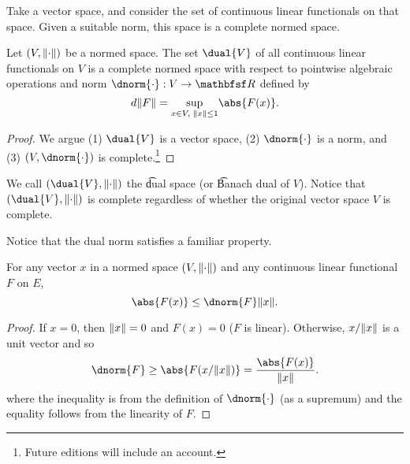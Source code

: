 

Take a vector space, and consider the set of continuous linear functionals on that space.
Given a suitable norm, this space is a complete normed space.


\begin{proposition}
	Let $(V, \lVert\cdot\rVert)$ be a normed space.
	The set $\dual{V}$ of all continuous linear functionals on $V$ is a complete normed space with respect to pointwise algebraic operations and norm $\dnorm{\cdot}: V \to \R$ defined by
	\[
		d\norm{F} = \underset{x \in V, \;\norm{x} \leq 1}{\sup} \abs{F(x)}.
	\]
	\begin{proof}
	We argue (1) $\dual{V}$ is a vector space,  (2) $\dnorm{\cdot}$ is a norm, and (3) $(V, \dnorm{\cdot})$ is complete.\footnote{Future editions will include an account.}		
	\end{proof}
\end{proposition}

We call $(\dual{V}, \normm{\cdot})$ the \t{dual space} (or \t{Banach dual of $V$}).
Notice that $(\dual{V}, \normm{\cdot})$ is complete regardless of whether the original vector space $V$ is complete.


Notice that the dual norm satisfies a familiar property.

\begin{proposition}
	For any vector $x$ in a normed space $(V, \lVert\cdot\rVert)$ and any continuous linear functional $F$ on $E$,
	\[
		\abs{F(x)} \leq \dnorm{F}\norm{x}.
	\]
	\begin{proof}
		If $x = 0$, then $\lVert x\rVert = 0$ and $F(x) = 0$ ($F$ is linear). Otherwise, $x/\lVert x\rVert$ is a unit vector and so
		\[
			\dnorm{F} \geq \abs{F(x/\norm{x})} = \frac{\abs{F(x)}}{\norm{x}}.
		\]
		where the inequality is from the definition of $\dnorm{\cdot}$ (as a supremum) and the equality follows from the linearity of $F$.
	\end{proof}
\end{proposition}



\blankpage
